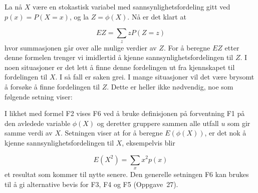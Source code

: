 \begin{center}  \end{center}

 La nå $X$ være en stokastisk variabel med sannsynlighetsfordeling
 gitt ved $p(x)=P(X=x)$, og la $Z=\phi (X)$. Nå er det klart at

\[  EZ=\sum_{z}zP(Z=z) \]
\noindent  hvor summasjonen går over alle mulige verdier av $Z$. For å
 beregne $EZ$ etter denne formelen trenger vi imidlertid å kjenne
 sannsynlighetsfordelingen til $Z$. I noen situasjoner er det lett
 å finne denne fordelingen ut fra kjennskapet til fordelingen til
 $X$. I så fall er saken grei. I mange situasjoner vil det være
 brysomt å forsøke å finne fordelingen til $Z$. Dette er heller
 ikke nødvendig, noe som følgende setning viser:

\begin{center}  \end{center}
\noindent I likhet med formel F2 vises F6 ved å bruke definisjonen på
forventning F1 på den avledede variable $\phi (X)$ og deretter
gruppere sammen alle utfall $u$ som gir samme verdi av $X$. Setningen
viser at for å beregne $E(\phi (X))$, er det nok å kjenne
sannsynlighetsfordelingen til $X$, eksempelvis blir

\[ E(X^2)= \sum_{x} x^2p(x) \]
et resultat som kommer til nytte senere. Den generelle setningen
F6 kan brukes til å gi alternative bevis for F3, F4 og F5
(Oppgave~27). \\



